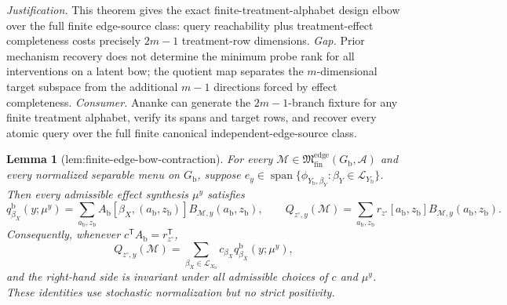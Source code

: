 \documentclass{article}
\newtheorem{lemma}{Lemma}
\begin{document}
\par\smallskip\noindent \textit{Justification.} This theorem gives the exact finite-treatment-alphabet design elbow over the full finite edge-source class: query reachability plus treatment-effect completeness costs precisely \(2m-1\) treatment-row dimensions. \textit{Gap.} Prior mechanism recovery does not determine the minimum probe rank for all interventions on a latent bow; the quotient map separates the \(m\)-dimensional target subspace from the additional \(m-1\) directions forced by effect completeness. \textit{Consumer.} Ananke can generate the \(2m-1\)-branch fixture for any finite treatment alphabet, verify its spans and target rows, and recover every atomic query over the full finite canonical independent-edge-source class.

\begin{lemma}[lem:finite-edge-bow-contraction]\label{lem:finite-edge-bow-contraction}
For every \(\mathcal M\in\mathfrak M_{\mathrm{fin}}^{\mathrm{edge}}(G_{\mathrm b},\mathcal A)\) and every normalized separable menu on \(G_{\mathrm b}\), suppose \(e_y\in\operatorname{span}\{\phi_{Y_{\mathrm b},\beta_Y}:\beta_Y\in\mathcal L_{Y_{\mathrm b}}\}\).  Then every admissible effect synthesis \(\mu^y\) satisfies
\[
q^{\mathrm b}_{\beta_X}(y;\mu^y)
=\sum_{a_{\mathrm b},z_{\mathrm b}}A_{\mathrm b}[\beta_X,(a_{\mathrm b},z_{\mathrm b})]
B_{\mathcal M,y}(a_{\mathrm b},z_{\mathrm b}),
\qquad
Q_{z^{\circ},y}(\mathcal M)
=\sum_{a_{\mathrm b},z_{\mathrm b}}r_{z^{\circ}}[a_{\mathrm b},z_{\mathrm b}]
B_{\mathcal M,y}(a_{\mathrm b},z_{\mathrm b}).
\]
Consequently, whenever \(c^{\mathsf T}A_{\mathrm b}=r_{z^{\circ}}^{\mathsf T}\),
\[
Q_{z^{\circ},y}(\mathcal M)=
\sum_{\beta_X\in\mathcal L_{X_{\mathrm b}}}c_{\beta_X}q^{\mathrm b}_{\beta_X}(y;\mu^y),
\]
and the right-hand side is invariant under all admissible choices of \(c\) and \(\mu^y\).  These identities use stochastic normalization but no strict positivity.
\end{lemma}
\end{document}
